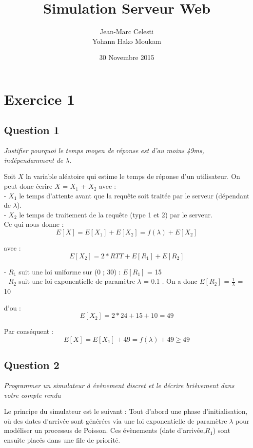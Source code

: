 \documentclass[12pt]{article}
\begin{document}
\title{Simulation Serveur Web}
\author{Jean-Marc Celesti \\ Yohann Hako Moukam}
\date{30 Novembre 2015}
\maketitle


\section{Exercice 1}
\subsection{Question 1}
\textit{Justifier pourquoi le temps moyen de réponse est d'au moins 49ms, indépendamment de $\lambda$. \\}

Soit $X$ la variable aléatoire qui estime le temps de réponse d'un utilisateur. On peut donc écrire $X$ = $X_{1}$ + $X_{2}$ avec :\\
- $X_{1}$ le temps d'attente avant que la requête soit traitée par le serveur (dépendant de $\lambda$).\\
- $X_{2}$ le temps de traitement de la requête (type 1 et 2) par le serveur.\\
Ce qui nous donne :\\
\[ E[X] = E[X_{1}] + E[X_{2}] = f(\lambda) + E[X_{2}] \]

avec : 
\[ E[X_{2}] = 2*RTT + E[R_{1}] + E[R_{2}]\]

\noindent - $R_{1}$ suit une loi uniforme sur (0 ; 30) : $E[R_{1}]$ = 15 \\
- $R_{2}$ suit une loi exponentielle de paramètre $\lambda$ = 0.1 . On a donc $E[R_{2}]$ = $\frac{1}{\lambda}$ = 10

d'ou :
\[ E[X_{2}] = 2*24 + 15 + 10 = 49\]

Par conséquent :
\[ E[X] = E[X_{1}] + 49 = f(\lambda) + 49 \geq 49 \]

\subsection{Question 2}
\textit{Programmer un simulateur à évènement discret et le décrire brièvement dans votre compte rendu \\}

Le principe du simulateur est le suivant : Tout d'abord une phase d'initialisation, où des dates d'arrivée sont générées via une loi exponentielle de paramètre $\lambda$ pour modéliser un processus de Poisson. Ces évènements (date d'arrivée,$R_{1}$) sont ensuite placés dans une file de priorité. \\
\end{document}
